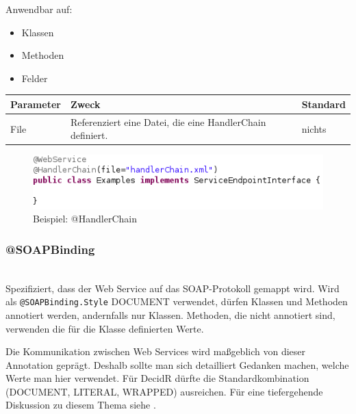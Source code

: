\documentclass[runningheads]{llncs}
\newcommand{\germanquote}[1]{\glqq{}#1\grqq{}}
\newcommand{\decidr}{DecidR}
\newcommand{\anntabwidth}{\textwidth}
\begin{document}
      \noindent{}Anwendbar auf:
      \begin{itemize}
       \item Klassen
       \item Methoden
       \item Felder\vfill
      \end{itemize}
    \tymin=75pt
    \tymax=220pt
    \begin{center}
    \begin{tabulary}{\anntabwidth}{|l|L|L|}
    \hline
    \textbf{Parameter} & \textbf{Zweck} & \textbf{Standard} \\
    \hline
      File &
      Referenziert eine Datei, die eine HandlerChain definiert. &
      nichts \\
    \hline
    \end{tabulary}
    \end{center} \vfill
    \tymin=10pt
    \textwidth
    \begin{figure}[ht!]
      \centering
      \includegraphics[width=\textwidth]{../images/AtHandlerChain.png}
      \caption{Beispiel: @HandlerChain}
      \label{fig:hc}
    \end{figure} \vfill

    \subsubsection{@SOAPBinding}\ \\
      Spezifiziert, dass der Web Service auf das SOAP-Protokoll gemappt wird. Wird als
      \texttt{@SOAPBinding.Style} \germanquote{DOCUMENT} verwendet, dürfen Klassen und Methoden
      annotiert werden, andernfalls nur Klassen. Methoden, die nicht annotiert sind, verwenden die
      für die Klasse definierten Werte.

      Die Kommunikation zwischen Web Services wird maßgeblich von dieser Annotation geprägt.
      Deshalb sollte man sich detailliert Gedanken machen, welche Werte man hier verwendet. Für
      \decidr{} dürfte die Standardkombination (DOCUMENT, LITERAL, WRAPPED) ausreichen. Für eine
      tiefergehende Diskussion zu diesem Thema siehe \cite{which_wsdl}.
\end{document}
